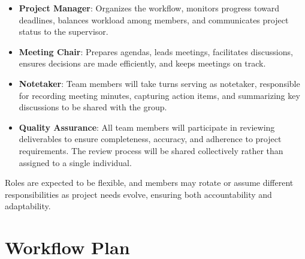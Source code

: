 \documentclass{article}
\begin{document}
\begin{itemize}
  \item \textbf{Project Manager}: Organizes the workflow, monitors progress toward deadlines, balances workload among members, and communicates project status to the supervisor.
  
  \item \textbf{Meeting Chair}: Prepares agendas, leads meetings, facilitates discussions, ensures decisions are made efficiently, and keeps meetings on track.
  
  \item \textbf{Notetaker}: Team members will take turns serving as notetaker, responsible for recording meeting minutes, capturing action items, and summarizing key discussions to be shared with the group.
  
  \item \textbf{Quality Assurance}: All team members will participate in reviewing deliverables to ensure completeness, accuracy, and adherence to project requirements. The review process will be shared collectively rather than assigned to a single individual.
\end{itemize}

\noindent
Roles are expected to be flexible, and members may rotate or assume different responsibilities as project needs evolve, ensuring both accountability and adaptability.

\section{Workflow Plan}

\end{document}
